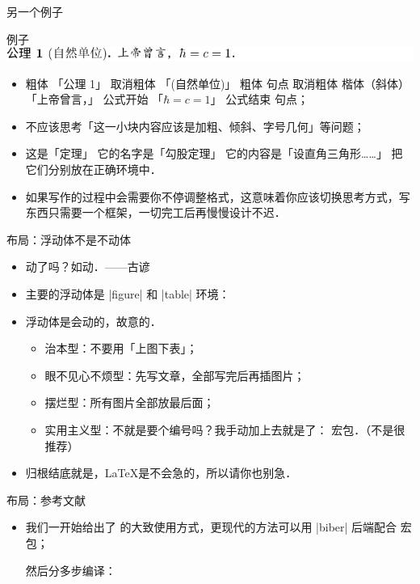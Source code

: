 \def\formto{ \raisebox{.18ex}{ $\to$ } }
\begin{frame}{另一个例子}
	\begin{block}{例子}
		\includegraphics[width = \textwidth]{images/Theorem example.pdf}
	\end{block}
	\begin{itemize}
		\item<+-> 粗体\formto
		      「公理 1」\formto
		      取消粗体\formto
		      「(自然单位)」\formto
		      粗体\formto
		      句点\formto
		      取消粗体\formto
		      楷体（斜体）\formto
		      「上帝曾言，」\formto
		      公式开始\formto
		      「$\hbar = c = 1$」\formto
		      公式结束\formto
		      句点；
		\item<+-> 不应该思考「这一小块内容应该是加粗、倾斜、字号几何」等问题；
		\item<+-> 这是「定理」\formto
		      它的名字是「勾股定理」\formto
		      它的内容是「设直角三角形……」\formto
		      把它们分别放在正确环境中．
        \item<+-> 如果写作的过程中会需要你不停调整格式，这意味着你应该切换思考方式，写东西只需要一个框架，一切完工后再慢慢设计不迟．
	\end{itemize}
\end{frame}

\begin{frame}[fragile]{布局：浮动体不是\alert{不动体}}
	\begin{itemize}
		\item<+-> 动了吗？如动．\kern\ccwd ——古谚
		\item<+-> 主要的浮动体是 |figure| 和 |table| 环境：
		\item<+-> 浮动体是会动的，\alert{故意的}．
			\begin{itemize}
				\item 治本型：不要用「上图下表」；
				\item 眼不见心不烦型：先写文章，全部写完后再插图片；
				\item 摆烂型：所有图片全部放最后面；
				\item 实用主义型：不就是要个编号吗？我手动加上去就是了： 宏包．（不是很推荐）
			\end{itemize}
		\item<+-> 归根结底就是，\LaTeX{}是不会急的，所以请你也别急．
	\end{itemize}
\end{frame}

\begin{frame}[fragile]{布局：参考文献}
	\begin{itemize}
		\item 我们一开始给出了 \BibTeX{} 的大致使用方式，更现代的方法可以用 |biber| 后端配合  宏包；
		      
		      然后分多步编译：
		      
	\end{itemize}
\end{frame}